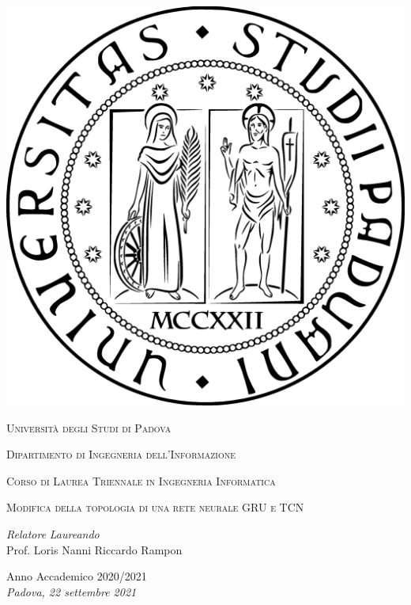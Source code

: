 \documentclass[a4paper, 12pt]{book}
\begin{document}
	\renewcommand{\contentsname}{\vspace{-2cm} Indice \vspace{-0.5cm}}
	
	\begin{titlepage}
	
		\begin{center}
		
			\includegraphics[scale=0.11]{images/sigillo.eps}
			\vspace*{1cm}
			
			\textsc{\LARGE Università degli Studi di Padova}\\
			\vspace{0.25cm}
			
			\textsc{\normalsize Dipartimento di Ingegneria dell'Informazione}\\
			\vspace{0.25cm}
			
			\textsc{\normalsize Corso di Laurea Triennale in Ingegneria Informatica}
			\vfill
			
			\textsc{\LARGE Modifica della topologia di una rete neurale GRU e TCN}\\
			\vfill
			\vspace{4cm}
						
			\textsl{\large Relatore} \hfill \textsl{\large Laureando}\\
			\large Prof. Loris Nanni \hfill Riccardo Rampon
			\vfill
			
			{\large Anno Accademico 2020/2021}\\
			\textsl{\large Padova, 22 settembre 2021}				
		
		\end{center}
		
	\end{titlepage}
	
\end{document}
